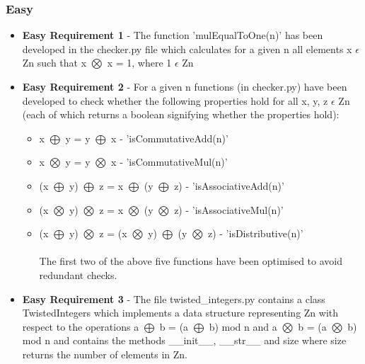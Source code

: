 \documentclass[11]{article}
\begin{document}
	 	\subsubsection{Easy}
			\begin{itemize}
				\item \textbf{Easy Requirement 1} - The function 'mulEqualToOne(n)' has been developed in the checker.py file which calculates for a given n all elements x $\epsilon$ Zn such that x $\bigotimes$ x = 1, where 1 $\epsilon$ Zn
				\item \textbf{Easy Requirement 2} - For a given n functions (in checker.py) have been developed to check whether the following properties hold for all x, y, z $\epsilon$ Zn (each of which returns a boolean signifying whether the properties hold):
				\begin{itemize}
					\item x $\bigoplus$ y = y $\bigoplus$ x - 'isCommutativeAdd(n)'
					\item x $\bigotimes$ y = y $\bigotimes$ x - 'isCommutativeMul(n)'
					\item (x $\bigoplus$ y) $\bigoplus$ z = x $\bigoplus$ (y $\bigoplus$ z) - 'isAssociativeAdd(n)'
					\item (x $\bigotimes$ y) $\bigotimes$ z = x $\bigotimes$ (y $\bigotimes$ z) - 'isAssociativeMul(n)'
					\item (x $\bigoplus$ y) $\bigotimes$ z = (x $\bigotimes$ y) $\bigoplus$ (y $\bigotimes$ z) - 'isDistributive(n)' \\\\ The first two of the above five functions have been optimised to avoid redundant checks.
				\end{itemize}
				
				\item \textbf{Easy Requirement 3} - The file twisted\_integers.py contains a class TwistedIntegers which implements a data structure representing Zn with respect to the operations a $\bigoplus$ b = (a $\bigoplus$ b) mod n and a $\bigotimes$ b = (a $\bigotimes$ b) mod n and contains the methods \_\_init\_\_, \_\_str\_\_ and size where size returns the number of elements in Zn.
			\end{itemize}
\end{document}
